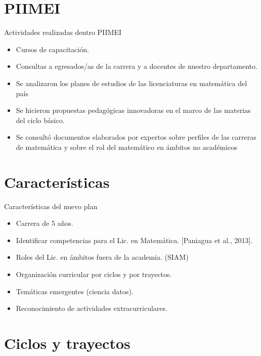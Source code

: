\documentclass[11pt]{beamer}
\begin{document}
\section{PIIMEI}

\begin{frame}{Actividades realizadas dentro PIIMEI}
\begin{block}{}
\begin{itemize}
\item<+-> Cursos de capacitación.
\item<+-> Consultas a egresados/as de la carrera y a docentes de nuestro departamento.
\item<+-> Se analizaron los planes de estudios de las licenciaturas en matemática del país
\item<+-> Se hicieron propuestas pedagógicas innovadoras en el marco de las materias del ciclo básico.
\item<+-> Se consultó documentos elaborados por expertos sobre perfiles de las carreras de matemática y sobre el rol del matemático en ámbitos no académicos
\end{itemize}
\end{block}


\end{frame}

\section{Características}


\begin{frame}{Características del nuevo plan}

\begin{itemize}
\item<+-> Carrera de 5 años.
\item<+->Identificar competencias para el Lic. en Matemática.  [Paniagua et al., 2013]. 
\item<+-> Roles del Lic. en ámbitos fuera de la academia. (SIAM) 
  \item<+-> Organización curricular por ciclos y por trayectos.
 \item<+-> Temáticas emergentes (ciencia datos).
\item<+-> Reconocimiento de actividades extracurriculares.
 \end{itemize}


\end{frame}




\section{Ciclos y trayectos}
\end{document}
